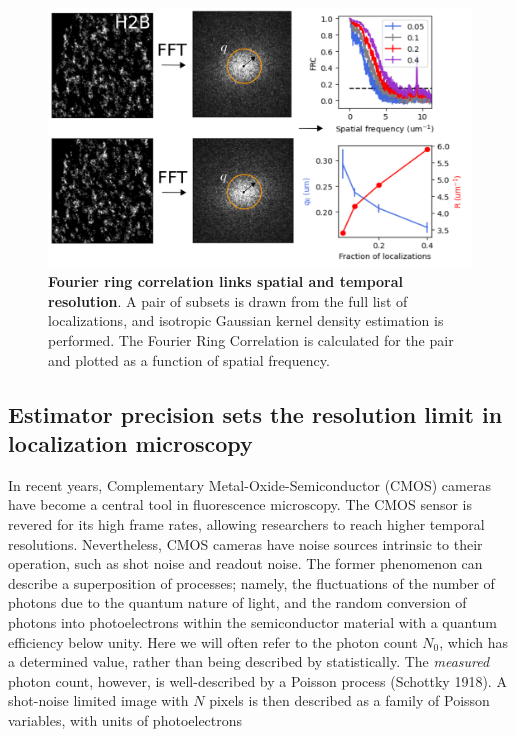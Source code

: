 \documentclass{ucetd}
\begin{document}
\begin{figure}
\begin{center}
\includegraphics[width=13cm]{FRC.png}
\end{center}
\caption{\textbf{Fourier ring correlation links spatial and temporal resolution}. A pair of subsets is drawn from the full list of localizations, and isotropic Gaussian kernel density estimation is performed. The Fourier Ring Correlation is calculated for the pair and plotted as a function of spatial frequency.}
\end{figure}


\subsection{Estimator precision sets the resolution limit in localization microscopy}

In recent years, Complementary Metal-Oxide-Semiconductor (CMOS) cameras have become a central tool in fluorescence microscopy. The CMOS sensor is revered for its high frame rates, allowing researchers to reach higher temporal resolutions. Nevertheless, CMOS cameras have noise sources intrinsic to their operation, such as shot noise and readout noise. The former phenomenon can describe a superposition of processes; namely, the fluctuations of the number of photons due to the quantum nature of light, and the random conversion of photons into photoelectrons within the semiconductor material with a quantum efficiency below unity. Here we will often refer to the photon count $N_{0}$, which has a determined value, rather than being described by statistically. The \emph{measured} photon count, however, is well-described by a Poisson process (Schottky 1918). A shot-noise limited image with $N$ pixels is then described as a family of Poisson variables, with units of photoelectrons
\end{document}
